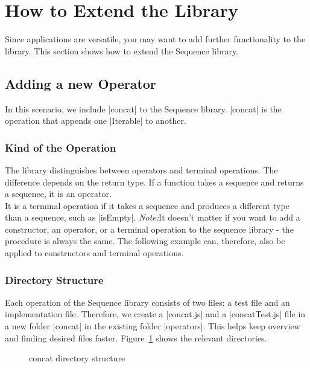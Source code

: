 \section{How to Extend the Library}
\label{sec:How to Extend the Library}
Since applications are versatile, you may want to add further functionality
to the library. This section shows how to extend the Sequence library.
\subsection{Adding a new Operator}
\label{sub:Adding a new Operator}
In this scenario, we include |concat| to the Sequence library. |concat| is the
operation that appends one |Iterable| to another.

\subsubsection{Kind of the Operation}
\label{subsub:Kind of the Operation}
The library distinguishes between operators and terminal operations. The
difference depends on the return type. If a function takes a sequence and
returns a sequence, it is an operator. \\ 
It is a terminal operation if it takes a sequence and produces a different type
than a sequence, such as |isEmpty|.
\newline
\textit{Note:}It doesn't matter if you want to add a constructor, an operator, or a terminal
operation to the sequence library - the procedure is always the same. The
following example can, therefore, also be applied to constructors and terminal
operations.

\subsubsection{Directory Structure}
\label{subsub:Directory Structure}
Each operation of the Sequence library consists of two files: a test file and
an implementation file. Therefore, we create a |concat.js| and a
|concatTest.js| file in a new folder |concat| in the existing folder
|operators|. This helps keep overview and finding desired files faster.
Figure~\ref{fig:concat_dir} shows the relevant directories.

\begin{figure}[H]
  \caption{concat directory structure}
  \label{fig:concat_dir}
\end{figure}

